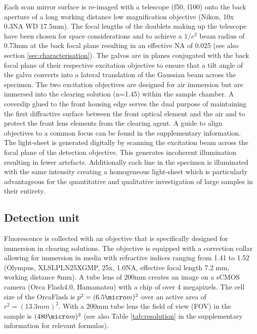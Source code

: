\documentclass[12pt]{spieman}  %
\begin{document}
\begin{spacing}{2}
Each scan mirror surface is re-imaged with a telescope (f50, f100) onto the back aperture of a long working distance low magnification objective (Nikon, 10x 0.3NA WD 17.5mm). The focal lengths of the doublets making up the telescope have been chosen for space considerations and to achieve a $1/e^2$ beam radius of 0.73mm at the back focal plane resulting in an effective NA of 0.025 (see also section \ref{sec:characterisation}). The galvos are in planes conjugated with the back focal plane of their respective excitation objective to ensure that a tilt angle of the galvo converts into a lateral translation of the Gaussian beam across the specimen. The two excitation objectives are designed for air immersion but are immersed into the clearing solution (n=1.45) within the sample chamber. A coverslip glued to the front housing edge serves the dual purpose of maintaining the first diffractive surface between the front optical element and the air and to protect the front lens elements from the clearing agent. A guide to align objectives to a common focus can be found in the supplementary information. The light-sheet is generated digitally\cite{Keller2008a,Keller2008b} by scanning the excitation beam across the focal plane of the detection objective. This generates incoherent illumination resulting in fewer artefacts. Additionally each line in the specimen is illuminated with the same intensity creating a homogeneous light-sheet which is particularly advantageous for the quantitative and qualitative investigation of large samples in their entirety.

\subsection{Detection unit}
			 
Fluorescence is collected with an objective that is specifically designed for immersion in clearing solutions. The objective is equipped with a correction collar allowing for immersion in media with refractive indices ranging from 1.41 to 1.52 (Olympus, XLSLPLN25XGMP, 25x, 1.0NA, effective focal length 7.2 mm, working distance 8mm). A tube lens of 200mm creates an image on a sCMOS camera (Orca Flash4.0, Hamamatsu) with a chip of over 4 megapixels. The cell size of the OrcaFlash is $p^2= (6.5\micro m)^2$ over an active area of $r^2= (13.3mm)^2$. With a 200mm tube lens the field of view (FOV) in the sample is $(480\micro m)^2$ (see also Table \ref{tab:resolution} in the supplementary information for relevant formulas). 


\end{spacing}
\end{document}
